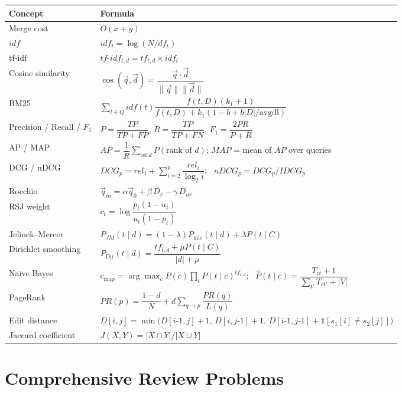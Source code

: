 \documentclass[11pt, a4paper]{article}
\begin{document}
\begin{center}
\small
\begin{tabular}{@{}p{3.6cm}p{10.8cm}@{}}
\toprule
\textbf{Concept} & \textbf{Formula} \\
\midrule
Merge cost & $O(x+y)$ \\
$idf$ & $idf_t = \log(N/df_t)$ \\
tf-idf & $tf\text{-}idf_{t,d} = tf_{t,d}\times idf_t$ \\
Cosine similarity & $\cos(\vec q,\vec d) = \dfrac{\vec q\cdot\vec d}{\lVert\vec q\rVert\lVert\vec d\rVert}$ \\
BM25 & $\sum_{t\in Q} idf(t)\dfrac{f(t,D)(k_1+1)}{f(t,D)+k_1(1-b+b|D|/\text{avgdl})}$ \\
Precision / Recall / $F_1$ & $P=\dfrac{TP}{TP+FP}$, $R=\dfrac{TP}{TP+FN}$, $F_1=\dfrac{2PR}{P+R}$ \\
AP / MAP & $AP=\dfrac1R\sum_{\text{rel } d} P(\text{rank of }d)$; $MAP$ = mean of $AP$ over queries \\
DCG / nDCG & $DCG_p=rel_1+\sum_{i=2}^p \dfrac{rel_i}{\log_2 i}$; \ $nDCG_p = DCG_p/IDCG_p$ \\
Rocchio & $\vec q_m = \alpha\vec q_0+\beta\,\overline{D_r}-\gamma\,\overline{D_{nr}}$ \\
RSJ weight & $c_t = \log\dfrac{p_t(1-u_t)}{u_t(1-p_t)}$ \\
Jelinek--Mercer & $P_{JM}(t\mid d) = (1-\lambda)P_{\text{mle}}(t\mid d)+\lambda P(t\mid C)$ \\
Dirichlet smoothing & $P_{\text{Dir}}(t\mid d) = \dfrac{tf_{t,d}+\mu P(t\mid C)}{|d|+\mu}$ \\
Na\"ive Bayes & $c_{\text{map}}=\arg\max_c P(c)\prod_t P(t\mid c)^{tf_{t,d}}$; \ $\hat P(t\mid c)=\dfrac{T_{ct}+1}{\sum_{t'}T_{ct'}+|V|}$ \\
PageRank & $PR(p)=\dfrac{1-d}{N}+d\sum_{q\to p}\dfrac{PR(q)}{L(q)}$ \\
Edit distance & $D[i,j]=\min\big(D[i\text{-}1,j]{+}1,\,D[i,j\text{-}1]{+}1,\,D[i\text{-}1,j\text{-}1]{+}\mathbb{1}[s_1[i]\ne s_2[j]]\big)$ \\
Jaccard coefficient & $J(X,Y) = |X\cap Y| / |X\cup Y|$ \\
\bottomrule
\end{tabular}
\end{center}

\section{Comprehensive Review Problems}
\end{document}
